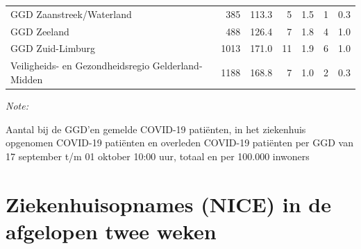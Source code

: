\documentclass[
  english,
  man,floatsintext]{apa6}
\begin{document}
\begin{table}
\begin{threeparttable}
\begin{tabular}{lrrrrrr}
GGD Zaanstreek/Waterland & 385 & 113.3 & 5 & 1.5 & 1 & 0.3\\
GGD Zeeland & 488 & 126.4 & 7 & 1.8 & 4 & 1.0\\
GGD Zuid-Limburg & 1013 & 171.0 & 11 & 1.9 & 6 & 1.0\\
Veiligheids- en Gezondheidsregio Gelderland-Midden & 1188 & 168.8 & 7 & 1.0 & 2 & 0.3\\
\bottomrule
\end{tabular}
\begin{tablenotes}
\item \textit{Note: } 
\item Aantal bij de GGD’en gemelde COVID-19 patiënten, in het ziekenhuis opgenomen COVID-19 patiënten en overleden COVID-19 patiënten per GGD van 17 september t/m 01 oktober 10:00 uur, totaal en per 100.000 inwoners
\end{tablenotes}
\end{threeparttable}
\endgroup{}
\end{table}

\newpage

\hypertarget{ziekenhuisopnames-nice-in-de-afgelopen-twee-weken}{%
\section{Ziekenhuisopnames (NICE) in de afgelopen twee weken}\label{ziekenhuisopnames-nice-in-de-afgelopen-twee-weken}}
\end{document}
